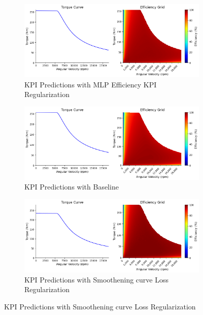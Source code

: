 \documentclass{report} %
\begin{document}
\begin{figure}[H]
    \centering
    \begin{subfigure}{1\textwidth}
        \centering
        \includegraphics[width=1\textwidth]{./ReportImages/predictions.png} 
        \caption{KPI Predictions with MLP Efficiency KPI Regularization} 
        \label{KPI_Predictions_with_MLP_Efficiency}
    \end{subfigure}\hfill
    \begin{subfigure}{1\textwidth}
        \centering
        \includegraphics[width=1\textwidth]{./ReportImages/predictions_Baseline.png} 
        \caption{KPI Predictions with Baseline} 
        \label{KPI_Predictions_with_Baseline}
    \end{subfigure}\hfill
    \begin{subfigure}{1\textwidth}
        \centering
        \includegraphics[width=1\textwidth]{./ReportImages/predictions_Smoothening.png} 
        \caption{KPI Predictions with Smoothening curve Loss Regularization} 
        \label{KPI_Predictions_with_Smoothening}
    \end{subfigure}\hfill
\end{figure}
\end{document}

